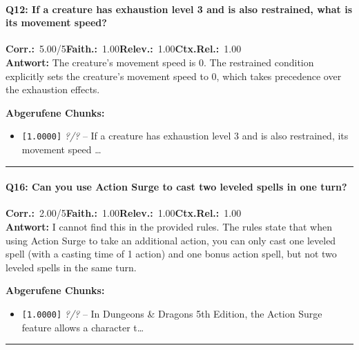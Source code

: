 \paragraph{Q12: If a creature has exhaustion level 3 and is also restrained, what is its movement speed?}
\noindent \textbf{Corr.:}~5.00/5\quad \textbf{Faith.:}~1.00\quad \textbf{Relev.:}~1.00\quad \textbf{Ctx.Rel.:}~1.00\\

\noindent\textbf{Antwort:} The creature's movement speed is 0. The restrained condition explicitly sets the creature's movement speed to 0, which takes precedence over the exhaustion effects.

\noindent\textbf{Abgerufene Chunks:}
\begin{itemize}[noitemsep, topsep=2pt]
  \item[\textbf{\#1}] \texttt{[1.0000]} \textit{?/?} -- If a creature has exhaustion level 3 and is also restrained, its movement speed \ldots
\end{itemize}
\vspace{4pt}
\hrule
\vspace{6pt}

\paragraph{Q16: Can you use Action Surge to cast two leveled spells in one turn?}
\noindent \textbf{Corr.:}~2.00/5\quad \textbf{Faith.:}~1.00\quad \textbf{Relev.:}~1.00\quad \textbf{Ctx.Rel.:}~1.00\\

\noindent\textbf{Antwort:} I cannot find this in the provided rules. The rules state that when using Action Surge to take an additional action, you can only cast one leveled spell (with a casting time of 1 action) and one bonus action spell, but not two leveled spells in the same turn.

\noindent\textbf{Abgerufene Chunks:}
\begin{itemize}[noitemsep, topsep=2pt]
  \item[\textbf{\#1}] \texttt{[1.0000]} \textit{?/?} -- In Dungeons \& Dragons 5th Edition, the Action Surge feature allows a character t\ldots
\end{itemize}
\vspace{4pt}
\hrule
\vspace{6pt}
